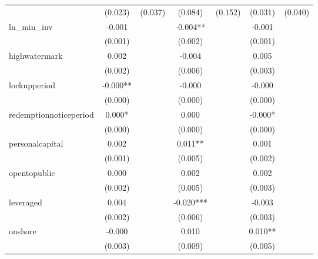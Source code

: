 {\begin{tabular}{l*{6}{c}}
            &     (0.023)   &     (0.037)   &     (0.084)   &     (0.152)   &     (0.031)   &     (0.040)   \\
[1em]
ln\_min\_inv  &      -0.001   &               &      -0.004** &               &      -0.001   &               \\
            &     (0.001)   &               &     (0.002)   &               &     (0.001)   &               \\
[1em]
highwatermark&       0.002   &               &      -0.004   &               &       0.005   &               \\
            &     (0.002)   &               &     (0.006)   &               &     (0.003)   &               \\
[1em]
lockupperiod&      -0.000** &               &      -0.000   &               &      -0.000   &               \\
            &     (0.000)   &               &     (0.000)   &               &     (0.000)   &               \\
[1em]
redemptionnoticeperiod&       0.000*  &               &       0.000   &               &      -0.000*  &               \\
            &     (0.000)   &               &     (0.000)   &               &     (0.000)   &               \\
[1em]
personalcapital&       0.002   &               &       0.011** &               &       0.001   &               \\
            &     (0.001)   &               &     (0.005)   &               &     (0.002)   &               \\
[1em]
opentopublic&       0.000   &               &       0.002   &               &       0.002   &               \\
            &     (0.002)   &               &     (0.005)   &               &     (0.003)   &               \\
[1em]
leveraged   &       0.004   &               &      -0.020***&               &      -0.003   &               \\
            &     (0.002)   &               &     (0.006)   &               &     (0.003)   &               \\
[1em]
onshore     &      -0.000   &               &       0.010   &               &       0.010** &               \\
            &     (0.003)   &               &     (0.009)   &               &     (0.005)   &               \\

\end{tabular}}
